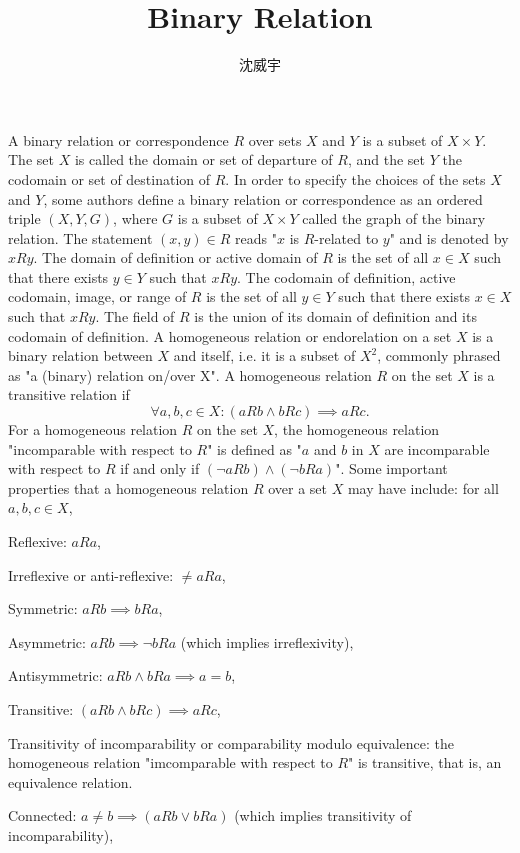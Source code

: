\documentclass[a4paper,12pt]{article}
\begin{document}
\title{Binary Relation}
\author{沈威宇}
\date{\temtoday}
\titletocdoc
{}
A binary relation or correspondence $R$ over sets $X$ and $Y$ is a subset of $X\times Y$. The set $X$ is called the domain or set of departure of $R$, and the set $Y$ the codomain or set of destination of $R$. In order to specify the choices of the sets $X$ and $Y$, some authors define a binary relation or correspondence as an ordered triple $(X,Y,G)$, where $G$ is a subset of $X\times Y$ called the graph of the binary relation. The statement $(x,y)\in R$ reads "$x$ is $R$-related to $y$" and is denoted by $xRy$. The domain of definition or active domain of $R$ is the set of all $x\in X$ such that there exists $y\in Y$ such that $xRy$. The codomain of definition, active codomain, image, or range of $R$ is the set of all $y\in Y$ such that there exists $x\in X$ such that $xRy$. The field of $R$ is the union of its domain of definition and its codomain of definition.
A homogeneous relation or endorelation on a set $X$ is a binary relation between $X$ and itself, i.e. it is a subset of $X^2$, commonly phrased as "a (binary) relation on/over X".
A homogeneous relation $R$ on the set $X$ is a transitive relation if
\[\forall a, b, c \in X\colon (aRb\land bRc)\implies aRc.\]
For a homogeneous relation $R$ on the set $X$, the homogeneous relation "incomparable with respect to $R$" is defined as "$a$ and $b$ in $X$ are incomparable with respect to $R$ if and only if $(\neg aRb)\land (\neg bRa)$".
Some important properties that a homogeneous relation $R$ over a set $X$ may have include: for all $a,b,c\in X$,
\bit
\item Reflexive: $aRa$,
\item Irreflexive or anti-reflexive: $\neq aRa$,
\item Symmetric: $aRb\implies bRa$,
\item Asymmetric: $aRb\implies \neg bRa$ (which implies irreflexivity),
\item Antisymmetric: $aRb\land bRa\implies a=b$,
\item Transitive: $(aRb\land bRc)\implies aRc$,
\item Transitivity of incomparability or comparability modulo equivalence: the homogeneous relation "imcomparable with respect to $R$" is transitive, that is, an equivalence relation.
\item Connected: $a\neq b\implies (aRb\lor bRa)$ (which implies transitivity of incomparability),
\end{document}

